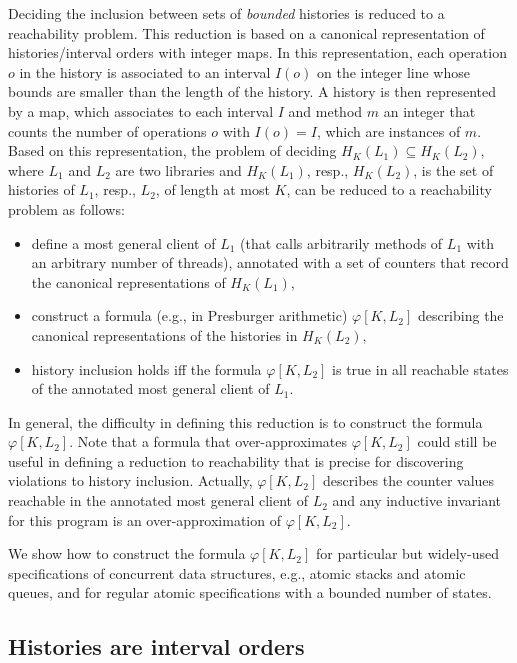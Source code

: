 Deciding the inclusion between sets of \emph{bounded} histories is reduced to a reachability problem. This reduction
is based on a canonical representation of histories/interval orders with integer maps. In this representation, each operation $o$ in the history
is associated to an interval $I(o)$ on the integer line whose bounds are smaller than the length of the history. A history is then 
represented by a map, which associates to each interval $I$ and method $m$ an integer that counts the number of operations 
$o$ with $I(o)=I$, which are instances of $m$. Based on this representation, the problem of deciding $H_K(L_1)\subseteq H_K(L_2)$, where
$L_1$ and $L_2$ are two libraries and $H_K(L_1)$, resp., $H_K(L_2)$, is the set of histories of $L_1$, resp., $L_2$, of length at most $K$, can be reduced to
a reachability problem as follows:
\begin{itemize}
	\item define a most general client of $L_1$ (that calls arbitrarily methods of $L_1$ with an arbitrary number of threads), annotated 
with a set of counters that record the canonical representations of $H_K(L_1)$,
	\item construct a formula (e.g., in Presburger arithmetic) $\varphi[K,L_2]$ describing the canonical representations of the histories in $H_K(L_2)$,
	\item history inclusion holds iff the formula $\varphi[K,L_2]$ is true in all reachable states of the annotated most general client of $L_1$.
\end{itemize}

In general, the difficulty in defining this reduction is to construct the formula $\varphi[K,L_2]$. 
Note that a formula that over-approximates $\varphi[K,L_2]$ could still be useful in defining a reduction to reachability 
that is precise for discovering violations to history inclusion. Actually, $\varphi[K,L_2]$ describes the counter values reachable
in the annotated most general client of $L_2$ and any inductive invariant for this program is an over-approximation of $\varphi[K,L_2]$. 

We show how to construct the formula $\varphi[K,L_2]$ for particular but widely-used specifications of concurrent data structures, 
e.g., atomic stacks and atomic queues, and for regular atomic specifications with a bounded number of states.

\subsection{Histories are interval orders}

